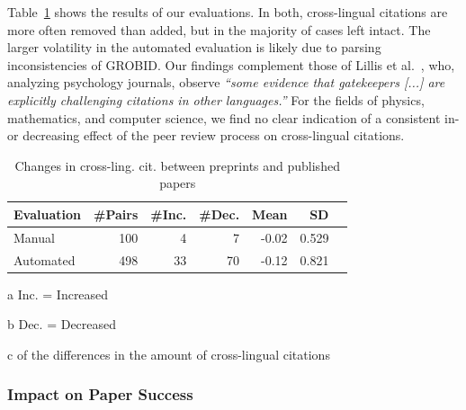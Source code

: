 Table~\ref{tab:peerreview} shows the results of our evaluations. In both, cross-lingual citations are more often removed than added, but in the majority of cases left intact. The larger volatility in the automated evaluation is likely due to parsing inconsistencies of GROBID. Our findings complement those of Lillis et al.~\cite{Lillis2010}, who, analyzing psychology journals, observe \textit{``some evidence that gatekeepers [...] are explicitly challenging citations in other languages.''} For the fields of physics, mathematics, and computer science, we find no clear indication of a consistent in- or decreasing effect of the peer review process on cross-lingual citations.

\begin{table}
\caption{Changes in cross-ling. cit. between preprints and published papers}
 \label{tab:peerreview}
  \centering
  \begin{small}
 \begin{threeparttable}
 \begin{tabular}{lrrrrrr}
 \toprule
   Evaluation & \#Pairs & \#Inc.\tnote{a} & \#Dec.\tnote{b} & Mean\tnote{c} & SD\tnote{c} \\
   \midrule
   Manual & 100 & 4 & 7 & -0.02 & 0.529 \\
   Automated & 498 & 33 & 70 & -0.12 & 0.821 \\
   \bottomrule
 \end{tabular}
 \begin{tablenotes}
    \item[a] Inc. = Increased
    \item[b] Dec. = Decreased
    \item[c] of the differences in the amount of cross-lingual citations
 \end{tablenotes}
\end{threeparttable}
  \end{small}
\end{table}

\subsubsection{Impact on Paper Success}

